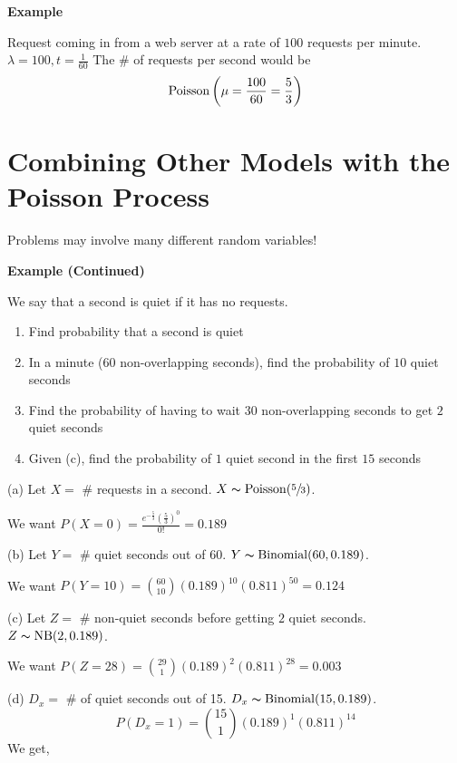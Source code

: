 \textbf{Example}

Request coming in from a web server at a rate of $ 100 $ requests per minute.
$ \lambda = 100, t=\frac{1}{60} $
The \# of requests per second would be
\[ \operatorname{Poisson}\left(\mu=\frac{100}{60}=\frac{5}{3}\right) \]

\section{Combining Other Models with the Poisson Process}

Problems may involve many different random variables!

\textbf{Example (Continued)}

We say that a second is quiet if it has no requests.
\begin{enumerate}[label=(\alph*)]
    \item Find probability that a second is quiet
    \item In a minute ($60$ non-overlapping seconds), find the probability of $10$ quiet seconds
    \item Find the probability of having to wait $ 30 $ non-overlapping seconds to get $ 2 $ quiet seconds
    \item Given (c), find the probability of $ 1 $ quiet second in the first $ 15 $ seconds
\end{enumerate}
(a) Let $ X= $ \# requests in a second. $ X \thicksim \operatorname{Poisson}(\sfrac{5}{3}) $.

We want $ P(X=0)=\frac{e^{-\frac{5}{3}}\left(\frac{5}{3}\right)^0}{0!}=0.189 $


(b) Let $ Y= $ \# quiet seconds out of 60. $ Y \thicksim \operatorname{Binomial}(60,0.189) $.

We want $ P(Y=10)=\binom{60}{10}(0.189)^{10}(0.811)^{50}=0.124 $

(c) Let $ Z= $ \# non-quiet seconds before getting $ 2 $ quiet seconds.
$ Z \thicksim \operatorname{NB}(2,0.189) $.

We want $ P(Z=28)=\binom{29}{1}(0.189)^2(0.811)^{28}=0.003 $

(d) $ D_x=$ \# of quiet seconds out of 15. $ D_x \thicksim \operatorname{Binomial}(15,0.189) $.
\[ P(D_x=1)=\binom{15}{1}(0.189)^1(0.811)^{14} \]
We get,

